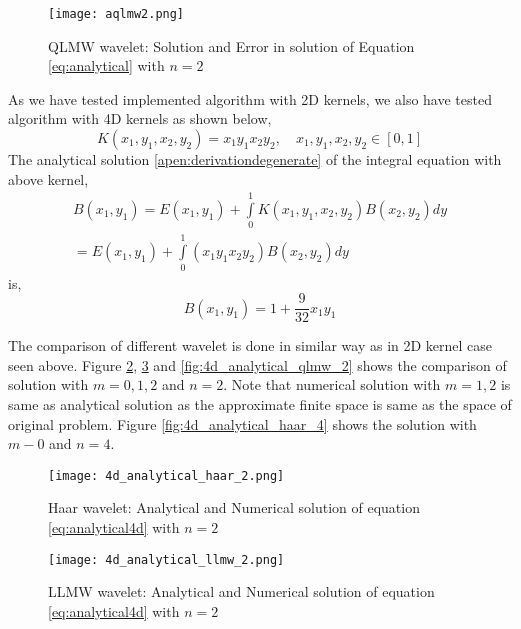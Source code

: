 \begin{figure}[h!]
\centering{}
\captionsetup{justification=centering}
\texttt{[image: aqlmw2.png]}
\caption{\label{fig:aqlmw2}QLMW wavelet: Solution and Error in solution of Equation \ref{eq:analytical} with $n=2$}
\end{figure}

As we have tested implemented algorithm with 2D kernels, we also have tested algorithm with 4D kernels as shown below,
\begin{equation}\label{eq:kernelanalytical4d}
 K(x_1,y_1,x_2,y_2)=x_1 y_1 x_2 y_2, \quad x_1,y_1,x_2,y_2 \in [0,1]
\end{equation}
The analytical solution \ref{apen:derivationdegenerate} of the integral equation with above kernel,
\begin{eqnarray} \label{eq:analytical4d}
B(x_1,y_1)=E(x_1,y_1)+\int\limits_0^1 K(x_1,y_1,x_2,y_2)B(x_2,y_2) dy \\
 = E(x_1,y_1)+\int\limits_0^1 (x_1y_1x_2y_2)B(x_2,y_2) dy
\end{eqnarray}
is,
\begin{equation}\label{eq:solutinoanalytical4d}
    B(x_1,y_1)=1+\frac{9}{32}x_1y_1
\end{equation}

The comparison of different wavelet is done in similar way as in 2D kernel case seen above. Figure \ref{fig:4d_analytical_haar_2}, \ref{fig:4d_analytical_llmw_2} and \ref{fig:4d_analytical_qlmw_2} shows the comparison of solution with $m=0,1,2$ and $n=2$. Note that numerical solution with $m=1,2$ is same as analytical solution as the approximate finite space is same as the space of original problem. Figure \ref{fig:4d_analytical_haar_4} shows the solution with $m-0$ and $n=4$. 

\begin{figure}[h!]
\centering{}
\captionsetup{justification=centering}
\texttt{[image: 4d\_analytical\_haar\_2.png]}
\caption{\label{fig:4d_analytical_haar_2}Haar wavelet: Analytical and Numerical solution of equation \ref{eq:analytical4d} with $n=2$}
\end{figure}



\begin{figure}[h!]
\centering{}
\captionsetup{justification=centering}
\texttt{[image: 4d\_analytical\_llmw\_2.png]}
\caption{\label{fig:4d_analytical_llmw_2}LLMW wavelet: Analytical and Numerical solution of equation \ref{eq:analytical4d} with $n=2$}
\end{figure}



